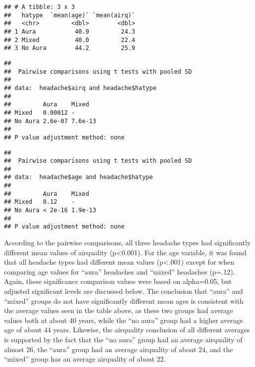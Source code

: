 \documentclass[]{article}
\newenvironment{Shaded}{\begin{snugshade}}{\end{snugshade}}
\newcommand{\DataTypeTok}[1]{\textcolor[rgb]{0.13,0.29,0.53}{#1}}
\newcommand{\KeywordTok}[1]{\textcolor[rgb]{0.13,0.29,0.53}{\textbf{#1}}}
\newcommand{\NormalTok}[1]{#1}
\newcommand{\OperatorTok}[1]{\textcolor[rgb]{0.81,0.36,0.00}{\textbf{#1}}}
\newcommand{\StringTok}[1]{\textcolor[rgb]{0.31,0.60,0.02}{#1}}
\begin{document}
\begin{verbatim}
## # A tibble: 3 x 3
##   hatype  `mean(age)` `mean(airq)`
##   <chr>         <dbl>        <dbl>
## 1 Aura           40.9         24.3
## 2 Mixed          40.0         22.4
## 3 No Aura        44.2         25.9
\end{verbatim}

\begin{Shaded}
\end{Shaded}

\begin{verbatim}
## 
##  Pairwise comparisons using t tests with pooled SD 
## 
## data:  headache$airq and headache$hatype 
## 
##         Aura    Mixed  
## Mixed   0.00012 -      
## No Aura 2.6e-07 7.6e-13
## 
## P value adjustment method: none
\end{verbatim}

\begin{Shaded}
\end{Shaded}

\begin{verbatim}
## 
##  Pairwise comparisons using t tests with pooled SD 
## 
## data:  headache$age and headache$hatype 
## 
##         Aura    Mixed  
## Mixed   0.12    -      
## No Aura < 2e-16 1.9e-13
## 
## P value adjustment method: none
\end{verbatim}

According to the pairwise comparisons, all three headache types had
significantly different mean values of airquality (p\textless{}0.001).
For the age variable, it was found that all headache types had different
mean values (p\textless{}.001) except for when comparing age values for
``aura'' headaches and ``mixed'' headaches (p=.12). Again, these
significance comparison values were based on alpha=0.05, but adjusted
significant levels are discussed below. The conclusion that ``aura'' and
``mixed'' groups do not have significantly different mean ages is
consistent with the average values seen in the table above, as these two
groups had average values both at about 40 years, while the ``no aura''
group had a higher average age of about 44 years. Likewise, the
airquality conclusion of all different averages is supported by the fact
that the ``no aura'' group had an average airquality of almost 26, the
``aura'' group had an average airquality of about 24, and the ``mixed''
group has an average airquality of about 22.
\end{document}
